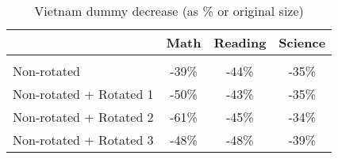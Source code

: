 \documentclass[10pt]{article}
\begin{document}
\begin{table}[htbp]

	\def\arraystretch{0.9}
  \centering
  \caption{Vietnam dummy decrease (as \% or original size)}
    \begin{tabular}{lccc}
    \toprule
    \midrule
          & \multicolumn{1}{c}{Math} & \multicolumn{1}{c}{Reading} & \multicolumn{1}{c}{Science} \\
    \hline \\
    Non-rotated & -39\% & -44\% & -35\% \\
    Non-rotated + Rotated 1 & -50\% & -43\% & -35\% \\
    Non-rotated + Rotated 2 & -61\% & -45\% & -34\% \\
    Non-rotated + Rotated 3 & -48\% & -48\% & -39\% \\
    \bottomrule
    \end{tabular}%
  \label{tab:addlabel}%
\end{table}%
\end{document}
